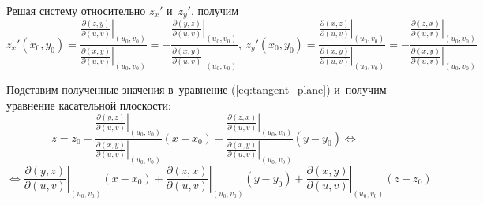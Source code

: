 Решая систему относительно $z_x'$ и~$z_y'$, получим
\begin{equation*}
z_x'(x_0, y_0) = \frac
{\left. \frac{\partial(z, y)}{\partial(u, v)} \right|_{(u_0, v_0)}}
{\left. \frac{\partial(x, y)}{\partial(u, v)} \right|_{(u_0, v_0)}} =
-\frac
{\left. \frac{\partial(y, z)}{\partial(u, v)} \right|_{(u_0, v_0)}}
{\left. \frac{\partial(x, y)}{\partial(u, v)} \right|_{(u_0, v_0)}}, \
z_y'(x_0, y_0) = \frac
{\left. \frac{\partial(x, z)}{\partial(u, v)} \right|_{(u_0, v_0)}}
{\left. \frac{\partial(x, y)}{\partial(u, v)} \right|_{(u_0, v_0)}} =
-\frac
{\left. \frac{\partial(z, x)}{\partial(u, v)} \right|_{(u_0, v_0)}}
{\left. \frac{\partial(x, y)}{\partial(u, v)} \right|_{(u_0, v_0)}}
\end{equation*}

Подставим полученные значения в~уравнение (\ref{eq:tangent_plane}) и~получим уравнение касательной плоскости:
\begin{equation*}
z = z_0 - \frac
{\left. \frac{\partial(y, z)}{\partial(u, v)} \right|_{(u_0, v_0)}}
{\left. \frac{\partial(x, y)}{\partial(u, v)} \right|_{(u_0, v_0)}} (x - x_0) -
\frac
{\left. \frac{\partial(z, x)}{\partial(u, v)} \right|_{(u_0, v_0)}}
{\left. \frac{\partial(x, y)}{\partial(u, v)} \right|_{(u_0, v_0)}} (y - y_0)  \Leftrightarrow
\end{equation*}
\begin{equation*}
\Leftrightarrow \left. \frac{\partial(y, z)}{\partial(u, v)} \right|_{(u_0, v_0)} (x - x_0) +
\left. \frac{\partial(z, x)}{\partial(u, v)} \right|_{(u_0, v_0)} (y - y_0) +
\left. \frac{\partial(x, y)}{\partial(u, v)} \right|_{(u_0, v_0)} (z - z_0)
\end{equation*}